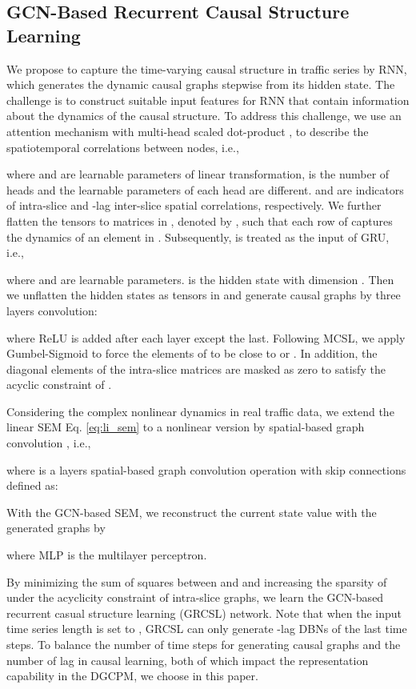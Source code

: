 \documentclass[letterpaper, 10 pt, conference]{ieeeconf}
\newcommand{\revise}[1]{{\color{black}{#1}}}
\begin{document}
\subsection{GCN-Based Recurrent Causal Structure Learning}




We propose to capture the time-varying causal structure in traffic series by RNN, which generates the dynamic causal graphs stepwise from its hidden state. The challenge is to construct suitable input features for RNN that contain information about the dynamics of the causal structure. To address this challenge, we use an attention mechanism with multi-head scaled dot-product \cite{vaswani2017attention}, to describe the spatiotemporal correlations between nodes, i.e.,

where  and  are learnable parameters of linear transformation,  is the number of heads and the learnable parameters of each head are different.  and  are indicators of intra-slice and -lag inter-slice spatial correlations, respectively. We further flatten the tensors  to matrices in , denoted by , such that each row of  captures the dynamics of an element in . Subsequently,  is treated as the input of GRU, i.e.,

where  and  are learnable parameters. \revise{ represents element-wise product between two matrices or tensors.}  is the hidden state with dimension . Then we unflatten the hidden states as tensors in  and generate causal graphs by three layers  convolution:

where ReLU is added after each layer except the last. Following MCSL, we apply Gumbel-Sigmoid to force the elements of  to be close to  or .
In addition, the diagonal elements of the intra-slice matrices are masked as zero to satisfy the acyclic constraint of .


Considering the complex nonlinear dynamics in real traffic data, we extend the linear SEM Eq. \eqref{eq:li_sem} to a nonlinear version by spatial-based graph convolution \cite{hamilton2017inductive}, i.e.,

where  is a  layers spatial-based graph convolution operation with skip connections defined as:

With the GCN-based SEM, we reconstruct the current state value with the generated graphs by

where MLP is the multilayer perceptron.


By minimizing the sum of squares between  and  and increasing the sparsity of  under the acyclicity constraint of intra-slice graphs, we learn the GCN-based recurrent casual structure learning (GRCSL) network. Note that when the input time series length is set to , GRCSL can only generate -lag DBNs of the last  time steps. To balance the number of time steps for generating causal graphs and the number of lag in causal learning, both of which impact the representation capability in the DGCPM, we choose  in this paper.
\end{document}
